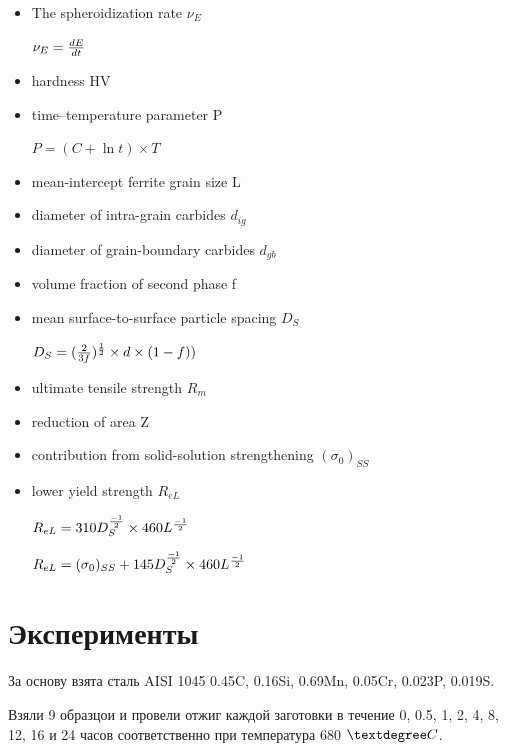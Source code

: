 \documentclass[a4paper, 14pt]{article}
\begin{document}
\begin{itemize}
		\item The spheroidization rate $\nu_E$
		
		$\nu_E={dE \over{dt}}$
		
		\item hardness HV
		
		\item time–temperature parameter P
		
		$P=(C+\ln t) \times T$
		
		\item mean-intercept ferrite grain size L
		
		\item diameter of intra-grain carbides $d_{ig}$
		
		\item diameter of grain-boundary carbides $d_{gb}$
		
		\item volume fraction of second phase f
		
		\item mean surface-to-surface particle spacing $D_S$
		
			$D_S= ({2 \over {3f}})^{1 \over2} \times d \times (1-f))$
		
		
		\item ultimate tensile strength $R_m$
		
		\item reduction of area Z
		
		\item contribution from solid-solution strengthening $(\sigma_0)_{SS}$
		
		\item lower yield strength $R_{eL}$
		
		$R_{eL}=310D^{-1 \over 2}_S \times 460L^{-1 \over 2}$
		
		$R_{eL}=(\sigma_0)_{SS}+ 145D^{-1 \over 2}_S \times 460L^{-1 \over 2} $
		
		
		
		
	\end{itemize}
	\newpage
	
	\section{Эксперименты}
	
	
	За основу взята сталь AISI 1045 0.45C, 0.16Si, 0.69Mn, 0.05Cr, 0.023P, 0.019S.
	
	Взяли 9 образцои и провели отжиг каждой заготовки в течение 0, 0.5, 1, 2, 4, 8, 12, 16 и 24 часов
	соответственно при температура 680 $ \textdegree C$.
	
\end{document}
